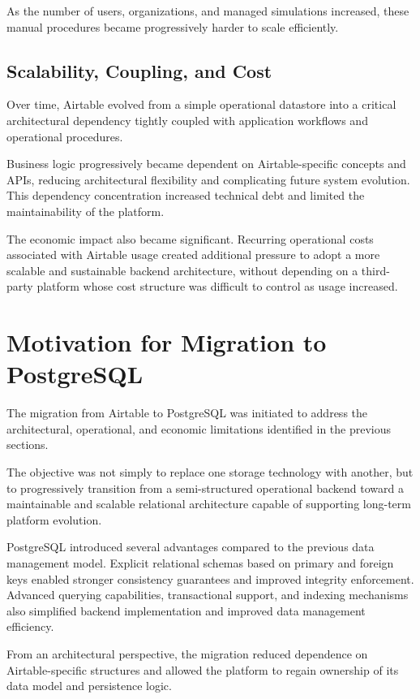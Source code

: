As the number of users, organizations, and managed simulations increased, these manual procedures became progressively harder to scale efficiently.

\subsection{Scalability, Coupling, and Cost}
Over time, Airtable evolved from a simple operational datastore into a critical architectural dependency tightly coupled with application workflows and operational procedures.

Business logic progressively became dependent on Airtable-specific concepts and APIs, reducing architectural flexibility and complicating future system evolution. This dependency concentration increased technical debt and limited the maintainability of the platform.

The economic impact also became significant. Recurring operational costs associated with Airtable usage created additional pressure to adopt a more scalable and sustainable backend architecture, without depending on a third-party platform whose cost structure was difficult to control as usage increased.

\section{Motivation for Migration to PostgreSQL}
The migration from Airtable to PostgreSQL was initiated to address the architectural, operational, and economic limitations identified in the previous sections.

The objective was not simply to replace one storage technology with another, but to progressively transition from a semi-structured operational backend toward a maintainable and scalable relational architecture capable of supporting long-term platform evolution.

PostgreSQL introduced several advantages compared to the previous data management model. Explicit relational schemas based on primary and foreign keys enabled stronger consistency guarantees and improved integrity enforcement. Advanced querying capabilities, transactional support, and indexing mechanisms also simplified backend implementation and improved data management efficiency.

From an architectural perspective, the migration reduced dependence on Airtable-specific structures and allowed the platform to regain ownership of its data model and persistence logic.